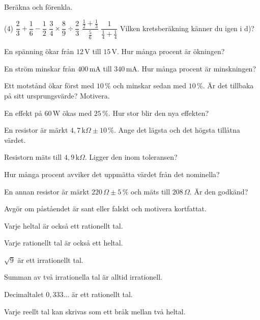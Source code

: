 Beräkna och förenkla.
\begin{delar}(4)
  \task $\dfrac{2}{3} + \dfrac{1}{6} - \dfrac{1}{2}$
  \task $\dfrac{3}{4} \times \dfrac{8}{9} \div \dfrac{2}{3}$
  \task $\dfrac{\frac{1}{2} + \frac{1}{3}}{\frac{5}{6}}$
  \task $\dfrac{1}{\frac{1}{4} + \frac{1}{4}}$
  \task* Vilken kretsberäkning känner du igen i d)?
\end{delar}

\begin{parts}
  \item En spänning ökar från $12\,\text{V}$ till $15\,\text{V}$. Hur många procent är ökningen?
  \item En ström minskar från $400\,\text{mA}$ till $340\,\text{mA}$. Hur många procent är
    minskningen?
  \item Ett motstånd ökar först med $10\,\%$ och minskar sedan med $10\,\%$. Är det tillbaka på
    sitt ursprungsvärde? Motivera.
  \item En effekt på $60\,\text{W}$ ökas med $25\,\%$. Hur stor blir den nya effekten?
\end{parts}

\begin{parts}
  \item En resistor är märkt $4{,}7\,\text{k}\Omega \pm 10\,\%$. Ange det lägsta och det högsta
    tillåtna värdet.
  \item Resistorn mäts till $4{,}9\,\text{k}\Omega$. Ligger den inom toleransen?
  \item Hur många procent avviker det uppmätta värdet från det nominella?
  \item En annan resistor är märkt $220\,\Omega \pm 5\,\%$ och mäts till $208\,\Omega$. Är den
    godkänd?
\end{parts}

Avgör om påståendet är sant eller falskt och motivera kortfattat.
\begin{parts}
  \item Varje heltal är också ett rationellt tal.
  \item Varje rationellt tal är också ett heltal.
  \item $\sqrt{9}$ är ett irrationellt tal.
  \item Summan av två irrationella tal är alltid irrationell.
  \item Decimaltalet $0{,}333\ldots$ är ett rationellt tal.
  \item Varje reellt tal kan skrivas som ett bråk mellan två heltal.
\end{parts}


